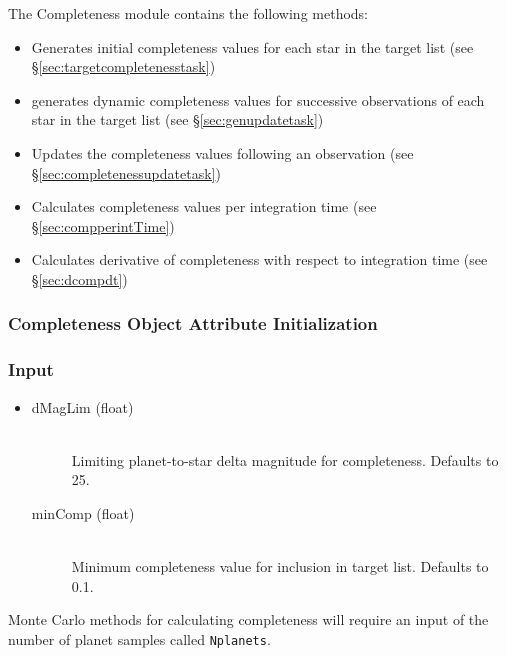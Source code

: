 \documentclass[cleanfoot]{asme2ej}
\begin{document}
The Completeness module contains the following methods:
\begin{itemize}[leftmargin=2in,font={\ttfamily}]
    \item[\texttt target\_completeness] Generates initial completeness values for each star in the target list (see \S\ref{sec:targetcompletenesstask})
    \item[\texttt gen\_update] generates dynamic completeness values for successive observations of each star in the target list  (see \S\ref{sec:genupdatetask})
    \item[\texttt completeness\_update] Updates the completeness values following an observation (see \S\ref{sec:completenessupdatetask})
    \item[\texttt comp\_per\_intTime] Calculates completeness values per integration time (see \S\ref{sec:compperintTime}) 
    \item[\texttt dcomp\_dt] Calculates derivative of completeness with respect to integration time (see \S\ref{sec:dcompdt})
\end{itemize}

\subsubsection{Completeness Object Attribute Initialization}

\subsubsection*{Input}
\begin{itemize}
\item 
\begin{description}
    \item[dMagLim (float)] \hfill \\ Limiting planet-to-star delta magnitude for completeness. Defaults to 25.
    \item[minComp (float)] \hfill \\ Minimum completeness value for inclusion in target list.  Defaults to 0.1.
\end{description}
\end{itemize}
Monte Carlo methods for calculating completeness will require an input of the number of planet samples called \verb+Nplanets+. 
\end{document}
